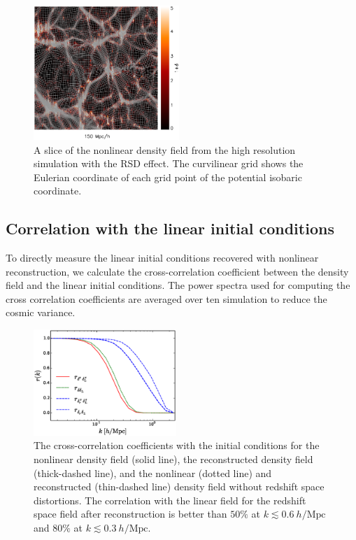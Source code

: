 \documentclass[aps,prx,twocolumn,superscriptaddress,groupedaddress,nofootinbib,amsfont]{revtex4}  %
\newcommand{\mr}{\mathrm}
\begin{document}
\begin{figure}[tbp]
\begin{center}
\includegraphics[width=0.49\textwidth]{map0512-0128_i0900_xz222_rsd3.eps}
\end{center}
\vspace{-0.7cm}
\caption{A slice of the nonlinear density field from the high resolution 
    simulation with the RSD effect. The curvilinear grid shows the Eulerian 
    coordinate of each grid point of the potential isobaric coordinate.}
\label{fig:map_rsd}
\end{figure}

\subsection{Correlation with the linear initial conditions}

To directly measure the linear initial conditions recovered with nonlinear 
reconstruction, we calculate the cross-correlation coefficient between the
density field and the linear initial conditions. 
The power spectra used for computing the cross correlation coefficients are 
averaged over ten simulation to reduce the cosmic variance.

\begin{figure}[tbp]
\begin{center}
\includegraphics[width=0.48\textwidth]{fa.eps}
\end{center}
\vspace{-0.7cm}
\caption{The cross-correlation coefficients with the initial conditions for the
    nonlinear density field (solid line), the reconstructed density field 
    (thick-dashed line), and the nonlinear (dotted line) and reconstructed 
    (thin-dashed line) density field without redshift space distortions.
    The correlation with the linear field for the redshift space field after 
    reconstruction is better than $50\%$ at $k\lesssim0.6\ h/\mr{Mpc}$ and 
    $80\%$ at $k\lesssim0.3\ h/\mr{Mpc}$.}
\label{fig:cc}
\end{figure}
\end{document}
